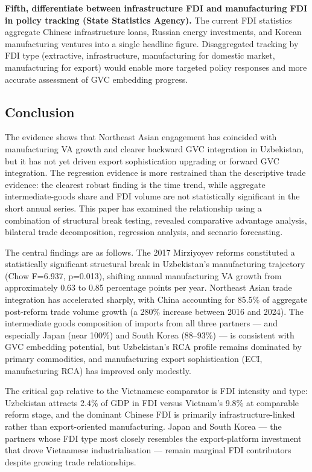 \documentclass[14pt,a4paper]{extarticle}
\begin{document}
\textbf{Fifth, differentiate between infrastructure FDI and manufacturing FDI in policy tracking (State Statistics Agency).} The current FDI statistics aggregate Chinese infrastructure loans, Russian energy investments, and Korean manufacturing ventures into a single headline figure. Disaggregated tracking by FDI type (extractive, infrastructure, manufacturing for domestic market, manufacturing for export) would enable more targeted policy responses and more accurate assessment of GVC embedding progress.
\subsection{Conclusion}

The evidence shows that Northeast Asian engagement has coincided with manufacturing VA growth and clearer backward GVC integration in Uzbekistan, but it has not yet driven export sophistication upgrading or forward GVC integration. The regression evidence is more restrained than the descriptive trade evidence: the clearest robust finding is the time trend, while aggregate intermediate-goods share and FDI volume are not statistically significant in the short annual series. This paper has examined the relationship using a combination of structural break testing, revealed comparative advantage analysis, bilateral trade decomposition, regression analysis, and scenario forecasting.

The central findings are as follows. The 2017 Mirziyoyev reforms constituted a statistically significant structural break in Uzbekistan's manufacturing trajectory (Chow F=6.937, p=0.013), shifting annual manufacturing VA growth from approximately 0.63 to 0.85 percentage points per year. Northeast Asian trade integration has accelerated sharply, with China accounting for 85.5\% of aggregate post-reform trade volume growth (a 280\% increase between 2016 and 2024). The intermediate goods composition of imports from all three partners --- and especially Japan (near 100\%) and South Korea (88--93\%) --- is consistent with GVC embedding potential, but Uzbekistan's RCA profile remains dominated by primary commodities, and manufacturing export sophistication (ECI, manufacturing RCA) has improved only modestly.

The critical gap relative to the Vietnamese comparator is FDI intensity and type: Uzbekistan attracts 2.4\% of GDP in FDI versus Vietnam's 9.8\% at comparable reform stage, and the dominant Chinese FDI is primarily infrastructure-linked rather than export-oriented manufacturing. Japan and South Korea --- the partners whose FDI type most closely resembles the export-platform investment that drove Vietnamese industrialisation --- remain marginal FDI contributors despite growing trade relationships.
\end{document}
